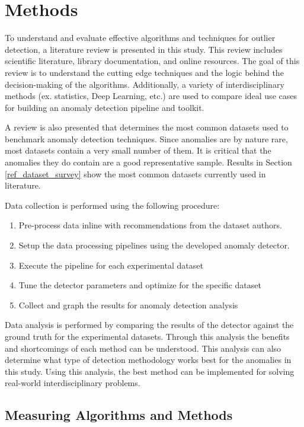 \section{Methods}
\label{ref_methods}

To understand and evaluate effective algorithms and techniques for outlier detection, a literature review is presented in this study. This review includes scientific literature, library documentation, and online resources. The goal of this review is to understand the cutting edge techniques and the logic behind the decision-making of the algorithms. Additionally, a variety of interdisciplinary methods (ex. statistics, Deep Learning, etc.) are used to compare ideal use cases for building an anomaly detection pipeline and toolkit.

A review is also presented that determines the most common datasets used to benchmark anomaly detection techniques. Since anomalies are by nature rare, most datasets contain a very small number of them. It is critical that the anomalies they do contain are a good representative sample. Results in Section \ref{ref_dataset_survey} show the most common datasets currently used in literature.

Data collection is performed using the following procedure:
\begin{enumerate}
    \item Pre-process data inline with recommendations from the dataset authors.
    \item Setup the data processing pipelines using the developed anomaly detector.
    \item Execute the pipeline for each experimental dataset
    \item Tune the detector parameters and optimize for the specific dataset
    \item Collect and graph the results for anomaly detection analysis
\end{enumerate}

Data analysis is performed by comparing the results of the detector against the ground truth for the experimental datasets. Through this analysis the benefits and shortcomings of each method can be understood. This analysis can also determine what type of detection methodology works best for the anomalies in this study. Using this analysis, the best method can be implemented for solving real-world interdisciplinary problems.

\subsection{Measuring Algorithms and Methods}

